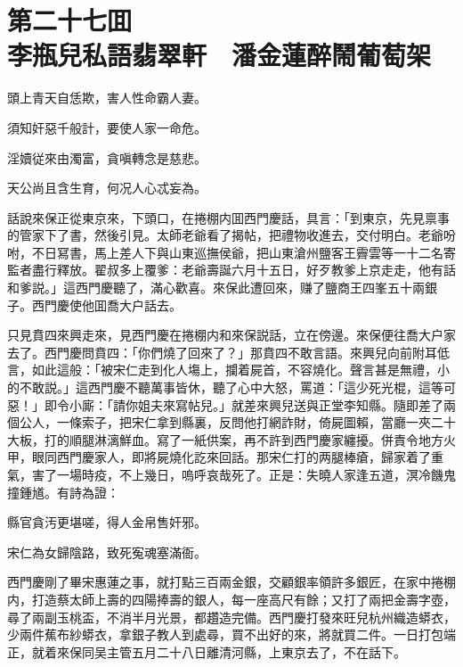 
\chapter*{第二十七囬　\\李瓶兒私語翡翠軒　潘金蓮醉鬧葡萄架}


\begin{myquote}
頭上青天自恁欺，害人性命霸人妻。

須知奸惡千般計，要使人家一命危。

淫嬻従來由濁富，貪嗔轉念是慈悲。

天公尚且含生育，何况人心忒妄為。
\end{myquote}

話說來保正從東京來，下頭口，在捲棚内囬西門慶話，具言：「到東京，先見禀事的管家下了書，然後引見。太師老爺看了揭帖，把禮物收進去，交付明白。老爺吩咐，不日冩書，馬上差人下與山東巡撫侯爺，把山東滄州鹽客王霽雲等一十二名寄監者盡行釋放。翟叔多上覆爹：老爺壽誕六月十五日，好歹教爹上京走走，他有話和爹説。」這西門慶聽了，滿心歡喜。來保此遭回來，赚了鹽商王四峯五十兩銀子。西門慶使他囬喬大户話去。

只見賁四來興走來，見西門慶在捲棚内和來保説話，立在傍邊。來保便往喬大户家去了。西門慶問賁四：「你們燒了回來了？」那賁四不敢言語。來興兒向前附耳低言，如此這般：「被宋仁走到化人塲上，攔着屍首，不容燒化。聲言甚是無禮，小的不敢説。」這西門慶不聽萬事皆休，聽了心中大怒，罵道：「這少死光棍，這等可惡！」即令小廝：「請你姐夫來寫帖兒。」就差來興兒送與正堂李知縣。隨即差了兩個公人，一條索子，把宋仁拿到縣裏，反問他打網詐財，倚屍圖賴，當廳一夾二十大板，打的順腿淋漓鮮血。寫了一紙供案，再不許到西門慶家纏擾。併責令地方火甲，眼同西門慶家人，即將屍燒化訖來回話。那宋仁打的两腿棒瘡，歸家着了重氣，害了一場時疫，不上幾日，嗚呼哀哉死了。正是：失曉人家逢五道，溟冷饑鬼撞鍾馗。有詩為證：

\begin{myquote}
縣官貪汚更堪嗟，得人金帛售奸邪。

宋仁為女歸陰路，致死寃魂塞滿衙。
\end{myquote}

西門慶剛了畢宋惠蓮之事，就打點三百兩金銀，交顧銀率領許多銀匠，在家中捲棚内，打造蔡太師上壽的四陽捧壽的銀人，每一座高尺有餘；又打了兩把金壽字壺，尋了兩副玉桃盃，不消半月光景，都趲造完備。西門慶打發來旺兒杭州織造蟒衣，少兩件蕉布紗蟒衣，拿銀子教人到處尋，買不出好的來，將就買二件。一日打包端正，就着來保同吴主管五月二十八日離清河縣，上東京去了，不在話下。

